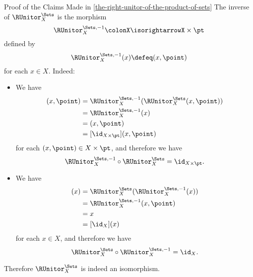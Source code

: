 \begin{Proof}{Proof of the Claims Made in \cref{the-right-unitor-of-the-product-of-sets}}%
    The inverse of $\RUnitor^{\Sets}_{X}$ is the morphism
    \[
        \RUnitor^{\Sets,-1}_{X}%
        \colon%
        X%
        \isorightarrow%
        X\times\pt%
    \]%
    defined by
    \[
        \RUnitor^{\Sets,-1}_{X}(x)%
        \defeq%
        (x,\point)
    \]%
    for each $x\in X$. Indeed:
    \begin{itemize}
        \item{}We have
            \begin{align*}
                [\RUnitor^{\Sets,-1}_{X}\circ\RUnitor^{\Sets}_{X}](x,\point) &= \RUnitor^{\Sets,-1}_{X}(\RUnitor^{\Sets}_{X}(x,\point))\\
                                                                             &= \RUnitor^{\Sets,-1}_{X}(x)\\
                                                                             &= (x,\point)\\
                                                                             &= [\id_{X\times\pt}](x,\point)
            \end{align*}
            for each $(x,\point)\in X\times\pt$, and therefore we have
            \[
                \RUnitor^{\Sets,-1}_{X}%
                \circ%
                \RUnitor^{\Sets}_{X}%
                =%
                \id_{X\times\pt}.%
            \]%
        \item{}We have
            \begin{align*}
                [\RUnitor^{\Sets}_{X}\circ\RUnitor^{\Sets,-1}_{X}](x) &= \RUnitor^{\Sets}_{X}(\RUnitor^{\Sets,-1}_{X}(x))\\
                                                                      &= \RUnitor^{\Sets,-1}_{X}(x,\point)\\
                                                                      &= x\\
                                                                      &= [\id_{X}](x)
            \end{align*}
            for each $x\in X$, and therefore we have
            \[
                \RUnitor^{\Sets}_{X}%
                \circ%
                \RUnitor^{\Sets,-1}_{X}%
                =%
                \id_{X}.%
            \]%
    \end{itemize}
    Therefore $\RUnitor^{\Sets}_{X}$ is indeed an isomorphism.


\end{Proof}
